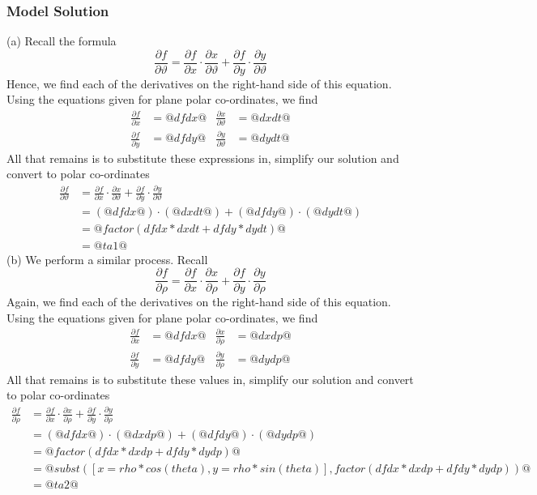 \documentclass[a4paper,10pt]{article}
\begin{document}
\subsubsection{Model Solution}
(a) Recall the formula \[ \frac{\partial f}{\partial \vartheta} = \frac{\partial f}{\partial x}\cdot\frac{\partial x}{\partial \vartheta} + \frac{\partial f}{\partial y}\cdot\frac{\partial y}{\partial \vartheta} \] Hence, we find each of the derivatives on the right-hand side of this equation. Using the equations given for plane polar co-ordinates, we find \begin{align*} \frac{\partial f}{\partial x} &= @dfdx@ & \frac{\partial x}{\partial \vartheta} &= @dxdt@ \\ \frac{\partial f}{\partial y} &= @dfdy@ & \frac{\partial y}{\partial \vartheta} &= @dydt@ \end{align*} All that remains is to substitute these expressions in, simplify our solution and convert to polar co-ordinates \begin{align*} \frac{\partial f}{\partial \vartheta} &= \frac{\partial f}{\partial x} \cdot \frac{\partial x}{\partial \vartheta} + \frac{\partial f}{\partial y} \cdot \frac{\partial y}{\partial \vartheta} \\ &= \left(@dfdx@\right)\cdot\left(@dxdt@\right) + \left(@dfdy@\right)\cdot\left(@dydt@\right) \\ &= @factor(dfdx*dxdt+dfdy*dydt)@ \\ &= @ta1@ \end{align*} (b) We perform a similar process. Recall \[ \frac{\partial f}{\partial \rho} = \frac{\partial f}{\partial x}\cdot\frac{\partial x}{\partial \rho} + \frac{\partial f}{\partial y}\cdot\frac{\partial y}{\partial \rho} \] Again, we find each of the derivatives on the right-hand side of this equation. Using the equations given for plane polar co-ordinates, we find \begin{align*} \frac{\partial f}{\partial x} &= @dfdx@ & \frac{\partial x}{\partial \rho} &= @dxdp@ \\ \frac{\partial f}{\partial y} &= @dfdy@ & \frac{\partial y}{\partial \rho} &= @dydp@ \end{align*} All that remains is to substitute these values in, simplify our solution and convert to polar co-ordinates \begin{align*} \frac{\partial f}{\partial \rho} &= \frac{\partial f}{\partial x} \cdot \frac{\partial x}{\partial \rho} + \frac{\partial f}{\partial y} \cdot \frac{\partial y}{\partial \rho} \\ &= \left(@dfdx@\right)\cdot\left(@dxdp@\right) + \left(@dfdy@\right)\cdot\left(@dydp@\right) \\ &=@factor(dfdx*dxdp+dfdy*dydp)@ \\ &= @subst([x=rho*cos(theta), y=rho*sin(theta)],factor(dfdx*dxdp+dfdy*dydp))@ \\ &= @ta2@ \end{align*}
\end{document}
